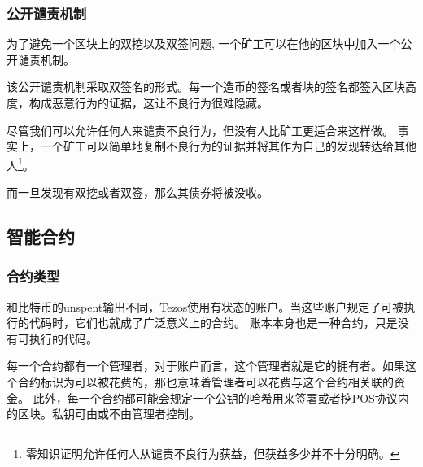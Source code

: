 \documentclass[letterpaper]{article}
\begin{document}
\subsubsection{公开谴责机制}
为了避免一个区块上的双挖以及双签问题, 一个矿工可以在他的区块中加入一个公开谴责机制。

该公开谴责机制采取双签名的形式。每一个造币的签名或者块的签名都签入区块高度，构成恶意行为的证据，这让不良行为很难隐藏。

尽管我们可以允许任何人来谴责不良行为，但没有人比矿工更适合来这样做。
事实上，一个矿工可以简单地复制不良行为的证据并将其作为自己的发现转达给其他人\footnote{零知识证明允许任何人从谴责不良行为获益，但获益多少并不十分明确。}。


而一旦发现有双挖或者双签，那么其债券将被没收。

\subsection{智能合约}

\subsubsection{合约类型}
和比特币的unspent输出不同，Tezos使用有状态的账户。当这些账户规定了可被执行的代码时，它们也就成了广泛意义上的合约。
账本本身也是一种合约，只是没有可执行的代码。

每一个合约都有一个管理者，对于账户而言，这个管理者就是它的拥有者。如果这个合约标识为可以被花费的，那也意味着管理者可以花费与这个合约相关联的资金。
此外，每一个合约都可能会规定一个公钥的哈希用来签署或者挖POS协议内的区块。私钥可由或不由管理者控制。
\end{document}
